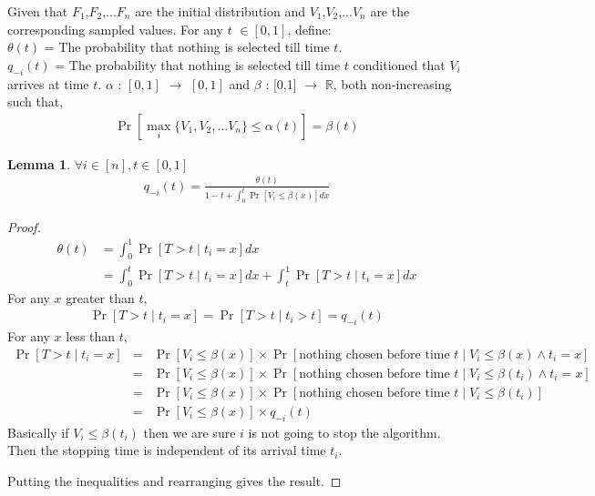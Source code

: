 \documentclass[10pt, letterpaper, twoside]{article}
\newtheorem{lemma}[theorem]{Lemma}
\begin{document}
	Given that $F_{1}$,$F_{2}$,...$F_{n}$ are the initial distribution and $V_{1}$,$V_{2}$,...$V_{n}$ are the corresponding sampled values. For any $t$ $\in [0,1] $, define:\\
	$\theta(t)$ = The probability that nothing is selected till time $t$.\\
	$q_{-i}(t)$ = The probability that nothing is selected till time $t$ conditioned that $V_{i}$ arrives at time $t$.
	$\alpha$ : $[0,1]$ $\rightarrow$ $[0,1]$ and $\beta$ : [0,1] $\rightarrow$ $\mathbb{R}$, both non-increasing such that,
	\begin{align*}
	\Pr[\max_{i} \{V_{1},V_{2},...V_{n}\} \leq \alpha(t)] = \beta(t)
	\end{align*}
	\begin{lemma} $\forall i \in [n], t \in [0,1]$
		\begin{align*}
		q_{-i}(t) = \frac{\theta(t)}{1-t+\int_{0}^{t} \Pr[V_{i} \leq \beta(x)]  dx}
		\end{align*}
	\end{lemma}
	\begin{proof}
		\begin{align*}
		\theta(t) &= \int_{0}^{1} \Pr[T > t \mid t_{i} = x] dx\\
		&= \int_{0}^{t} \Pr[T > t \mid t_{i} = x] dx + \int_{t}^{1} \Pr[T > t \mid t_{i} = x] dx
		\end{align*}
		For any $x$ greater than $t$,
		\begin{align*}
		\Pr[T > t \mid t_{i} = x] = \Pr[T > t \mid t_{i} > t] = q_{-i}(t)
		\end{align*}
		For any $x$ less than $t$,
		\begin{eqnarray*}
			\Pr[T > t \mid t_{i} = x] & = & \Pr[V_{i} \leq \beta(x)] \times \Pr[\text{nothing chosen before time }t \mid V_{i} \leq \beta(x) \wedge t_{i} = x]\\
			& = & \Pr[V_{i} \leq \beta(x)] \times \Pr[\text{nothing chosen before time }t \mid V_{i} \leq \beta(t_i) \wedge t_{i} = x]\\
			& = & \Pr[V_{i} \leq \beta(x)] \times \Pr[\text{nothing chosen before time }t \mid V_{i} \leq \beta(t_i)]\\
			& = & \Pr[V_{i} \leq \beta(x)] \times q_{-i}(t)
		\end{eqnarray*}
		Basically if $V_{i} \leq \beta(t_i)$ then we are sure $i$ is not going to stop the algorithm. Then the stopping time is independent of its arrival time $t_i$.
		
		Putting the inequalities and rearranging gives the result.
	\end{proof}
\end{document}
